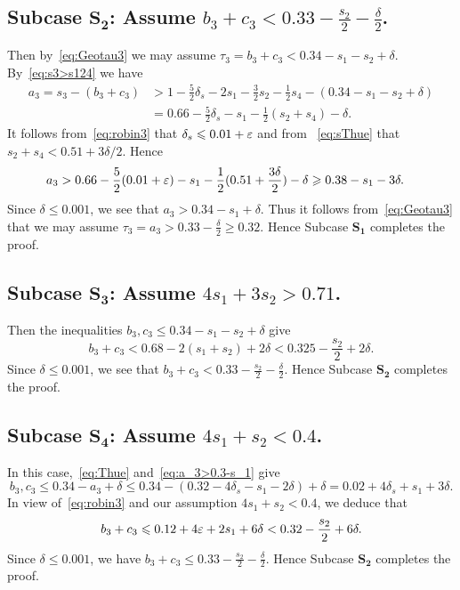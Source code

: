 \subsection*{Subcase $\mathbf{S_2}$: Assume
$b_3+c_3<0.33-\frac{s_2}{2}-\frac{\delta}{2}$.}

Then by~\eqref{eq:Geotau3} we may assume $\tau_3=b_3+c_3<0.34-s_1-s_2+\delta$. By~\eqref{eq:s3>s124} we have
\begin{align*}
a_3 = s_3 - (b_3+c_3) &> 1 - \frac{5}{2}\delta_s - 2s_1 - \frac{3}{2}s_2 - \frac{1}{2}s_4 - (0.34-s_1-s_2+ \delta)\\
& = 0.66- \frac{5}{2}\delta_s - s_1 - \frac{1}{2}(s_2+s_4)-\delta.
\end{align*}
It follows from~\eqref{eq:robin3} that $\delta_s\leqslant 0.01+\varepsilon$ and from
~\eqref{eq:sThue} that $s_2+s_4<0.51+3\delta/2$. Hence
 \begin{align*}
a_3
& > 0.66- \frac{5}{2}(0.01+\varepsilon) - s_1 - \frac{1}{2}(0.51+\frac{3\delta}{2}) - \delta \geqslant 0.38-s_1- 3\delta.
\end{align*}
Since $\delta\le 0.001$, we see that $a_3> 0.34-s_1+ \delta$.
Thus it follows from~\eqref{eq:Geotau3} that we may assume $\tau_3=a_3>0.33-\frac{\delta}{2}\geq 0.32$. Hence Subcase
$\mathbf{S_1}$ completes the proof.



\subsection*{Subcase $\mathbf{S_3}$: Assume $4s_1+3s_2>0.71$.}

Then the inequalities $b_3,c_3 \le 0.34-s_1-s_2+ \delta$ give
\[
b_3+c_3<0.68-2(s_1+s_2)+2\delta<
0.325 -\frac{s_2}{2}+2\delta.
\]
Since $\delta\leq 0.001$, we see that $b_3+c_3<0.33-\frac{s_2}{2}-\frac{\delta}{2}$. Hence Subcase $\mathbf{S_2}$ completes the proof.


\subsection*{Subcase $\mathbf{S_4}$: Assume $4s_1+s_2<0.4$.}


In this case,~\eqref{eq:Thue} and~\eqref{eq:a_3>0.3-s_1} give
\[
b_3,c_3 \le 0.34-a_3+\delta \le 0.34 - (0.32-4\delta_s-s_1-2\delta) +\delta= 0.02+4\delta_s+s_1+3\delta.
\]
In view of~\eqref{eq:robin3} and
our assumption $4s_1+s_2<0.4$, we deduce that
\begin{align*}
b_3+c_3 \leqslant 0.12+4\varepsilon + 2s_1+6\delta <
0.32-\frac{s_2}{2}+6\delta.
\end{align*}
Since $\delta\leq 0.001$, we have $b_3+c_3 \le 0.33-\frac{s_2}{2}-\frac{\delta}{2}$. Hence
Subcase $\mathbf{S_2}$ completes the proof.



